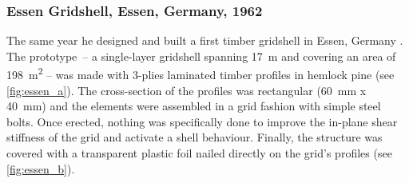 \subsubsection{Essen Gridshell, Essen, Germany, 1962}
The same year he designed and built a first timber gridshell in Essen, Germany \cite[p.~272]{IL10}. The prototype~-- a single-layer gridshell spanning \SI{17}{m} and covering an area of \SI{198}{m^2} -- was made with 3-plies laminated timber profiles in hemlock pine (see \cref{fig:essen_a}). The cross-section of the profiles was rectangular (\SI{60}{mm} x \SI{40}{mm}) and the elements were assembled in a grid fashion with simple steel bolts. Once erected, nothing was specifically done to improve the in-plane shear stiffness of the grid and activate a shell behaviour. Finally, the structure was covered with a transparent plastic foil nailed directly on the grid's profiles (see \cref{fig:essen_b}).



